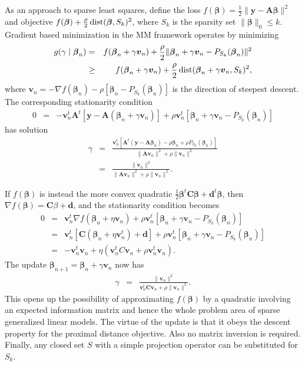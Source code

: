 \documentclass[12pt]{article}
\def\dist{\mathop{\rm dist}\nolimits}
\newcommand{\bd}{\boldsymbol{d}}
\newcommand{\bv}{\boldsymbol{v}}
\newcommand{\by}{\boldsymbol{y}}
\newcommand{\bA}{\boldsymbol{A}}
\newcommand{\bC}{\boldsymbol{C}}
\newcommand{\bbeta}{\boldsymbol{\beta}}
\begin{document}
As an approach to sparse least squares, define the loss $f(\bbeta)=\frac{1}{2}\|\by-\bA\bbeta\|^2$ and objective $f(\bbeta)+\frac{\rho}{2}\dist(\bbeta, S_k)^2$,
where $S_k$ is the sparsity set $\|\bbeta\|_0 \le k$. Gradient based minimization in the MM framework operates by  minimizing 
\begin{eqnarray*}
g(\gamma \mid \bbeta_n)& = & f(\bbeta_n + \gamma \bv_n)
+ \frac{\rho}{2}\|\bbeta_n + \gamma \bv_n- P_{S_k}(\bbeta_n)\|^2 \\
& \ge &  f(\bbeta_n + \gamma \bv_n) + \frac{\rho}{2}\dist(\bbeta_n + \gamma \bv_n, S_k)^2 ,
\end{eqnarray*}
where $\bv_n = -\nabla f(\bbeta_n)- \rho[\bbeta_n-P_{S_k}(\bbeta_n)]$
is the direction of steepest descent. The corresponding stationarity condition 
\begin{eqnarray*}
0 & = & -\bv_n^t\bA^t[\by-\bA (\bbeta_n + \gamma \bv_n)] 
+ \rho \bv_n^t[\bbeta_n + \gamma \bv_n- P_{S_k}(\bbeta_n)] 
\end{eqnarray*}
has solution
\begin{eqnarray*}
\gamma & = & \frac{\bv_n^t[\bA^t(\by-\bA \bbeta_n) -\rho \bbeta_n +\rho P_{S_k}(\bbeta_n)]}
{\|\bA \bv_n\|^2 + \rho \|\bv_n\|^2} \\
& = & \frac{\|\bv_n\|^2}{\|\bA \bv_n\|^2 + \rho \|\bv_n\|^2}. 
\end{eqnarray*}

If $f(\bbeta)$ is instead the more convex quadratic $\frac{1}{2}\bbeta^t\bC\bbeta+\bd^t\bbeta$, then $\nabla f(\bbeta) = \bC\beta+\bd$, and the
stationarity condition becomes
\begin{eqnarray*}
0 & = & \bv_n^t\nabla f(\bbeta_n+\eta \bv_n)
+ \rho \bv_n^t[\bbeta_n + \gamma \bv_n- P_{S_k}(\bbeta_n)] \\
& = & \bv_n^t[\bC(\bbeta_n+\eta \bv_n^t)+\bd]
+ \rho \bv_n^t[\bbeta_n + \gamma \bv_n- P_{S_k}(\bbeta_n)] \\
& = & -\bv_n^t\bv_n+ \eta (\bv_n^tC\bv_n+\rho \bv_n^t\bv_n). 
\end{eqnarray*}
The update $\bbeta_{n+1}=\bbeta_n + \gamma \bv_n$ now has
\begin{eqnarray*}
\gamma & = & \frac{\|\bv_n\|^2}{\bv_n^t \bC \bv_n + \rho \|\bv_n\|^2}. 
\end{eqnarray*}
This opens up the possibility of approximating $f(\bbeta)$ by
a quadratic involving an expected information matrix and hence
the whole problem area of sparse generalized linear models.
The virtue of the update is that it obeys the descent property 
for the proximal distance objective. Also no matrix inversion is
required. Finally, any closed set $S$ with a simple projection
operator can be substituted for $S_k$.
\end{document}
